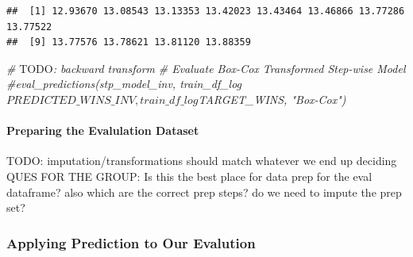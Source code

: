 \documentclass[
]{article}
\newenvironment{Shaded}{\begin{snugshade}}{\end{snugshade}}
\newcommand{\AlertTok}[1]{\textcolor[rgb]{0.94,0.16,0.16}{#1}}
\newcommand{\AttributeTok}[1]{\textcolor[rgb]{0.13,0.29,0.53}{#1}}
\newcommand{\CommentTok}[1]{\textcolor[rgb]{0.56,0.35,0.01}{\textit{#1}}}
\newcommand{\FunctionTok}[1]{\textcolor[rgb]{0.13,0.29,0.53}{\textbf{#1}}}
\newcommand{\NormalTok}[1]{#1}
\newcommand{\OtherTok}[1]{\textcolor[rgb]{0.56,0.35,0.01}{#1}}
\newcommand{\SpecialCharTok}[1]{\textcolor[rgb]{0.81,0.36,0.00}{\textbf{#1}}}
\newcommand{\StringTok}[1]{\textcolor[rgb]{0.31,0.60,0.02}{#1}}
\begin{document}
\begin{Shaded}
\end{Shaded}

\begin{verbatim}
##  [1] 12.93670 13.08543 13.13353 13.42023 13.43464 13.46866 13.77286 13.77522
##  [9] 13.77576 13.78621 13.81120 13.88359
\end{verbatim}

\begin{Shaded}
\begin{Highlighting}[]
\CommentTok{\# }\AlertTok{TODO}\CommentTok{: backward transform}
\CommentTok{\# Evaluate Box{-}Cox Transformed Step{-}wise Model}
\CommentTok{\#eval\_predictions(stp\_model\_inv, train\_df\_log$PREDICTED\_WINS\_INV, train\_df\_log$TARGET\_WINS, "Box{-}Cox")}
\end{Highlighting}
\end{Shaded}

\paragraph{Preparing the Evalulation
Dataset}\label{preparing-the-evalulation-dataset-1}

TODO: imputation/transformations should match whatever we end up
deciding QUES FOR THE GROUP: Is this the best place for data prep for
the eval dataframe? also which are the correct prep steps? do we need to
impute the prep set?

\subsubsection{Applying Prediction to Our
Evalution}\label{applying-prediction-to-our-evalution-1}
\end{document}
